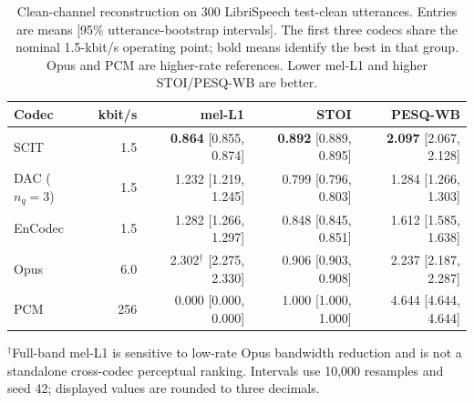 \begin{table}[t]
\centering
\caption{Clean-channel reconstruction on 300 LibriSpeech test-clean utterances. Entries are means [95\% utterance-bootstrap intervals]. The first three codecs share the nominal 1.5-kbit/s operating point; bold means identify the best in that group. Opus and PCM are higher-rate references. Lower mel-L1 and higher STOI/PESQ-WB are better.}
\label{tab:rv2-quality}
\small\setlength{\tabcolsep}{5pt}
\begin{tabular}{lrrrr}
\toprule
Codec & kbit/s & mel-L1 & STOI & PESQ-WB\\
\midrule
SCIT & 1.5 & \textbf{0.864} [0.855, 0.874] & \textbf{0.892} [0.889, 0.895] & \textbf{2.097} [2.067, 2.128]\\
DAC ($n_q=3$) & 1.5 & 1.232 [1.219, 1.245] & 0.799 [0.796, 0.803] & 1.284 [1.266, 1.303]\\
EnCodec & 1.5 & 1.282 [1.266, 1.297] & 0.848 [0.845, 0.851] & 1.612 [1.585, 1.638]\\
Opus & 6.0 & 2.302$^\dagger$ [2.275, 2.330] & 0.906 [0.903, 0.908] & 2.237 [2.187, 2.287]\\
PCM & 256 & 0.000 [0.000, 0.000] & 1.000 [1.000, 1.000] & 4.644 [4.644, 4.644]\\
\bottomrule
\end{tabular}
\par\smallskip
\parbox{\textwidth}{\footnotesize $^\dagger$Full-band mel-L1 is sensitive to low-rate Opus bandwidth reduction and is not a standalone cross-codec perceptual ranking. Intervals use 10,000 resamples and seed 42; displayed values are rounded to three decimals.}
\end{table}
